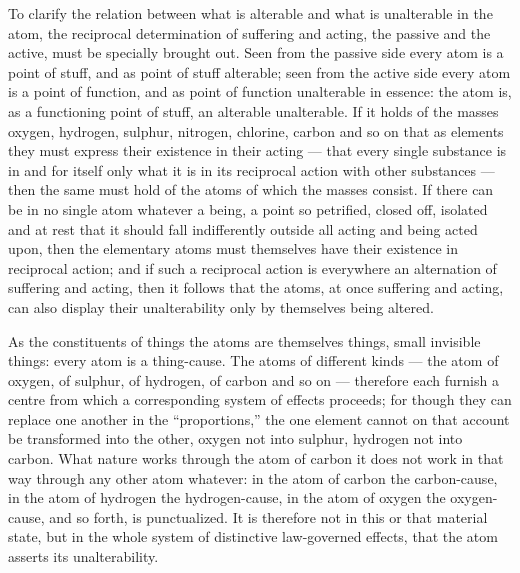 \documentclass[12pt,a4paper]{book}
\begin{document}
To clarify the relation between what is alterable and what is unalterable in
the atom, the reciprocal determination of suffering and acting, the passive and
the active, must be specially brought out. Seen
from the passive side every atom is a point of stuff, and as point of stuff
alterable; seen from the active side every atom is a point of function, and as
point of function unalterable in essence: the atom is, as a functioning point
of stuff, an alterable unalterable. If it holds of the masses oxygen, hydrogen,
sulphur, nitrogen, chlorine, carbon and so on that as elements they must
express their existence in their acting --- that every single substance is in
and for itself only what it is in its reciprocal action with other substances
--- then the same must hold of the atoms of which the masses consist. If there
can be in no single atom whatever a being, a point so petrified, closed off,
isolated and at rest that it should fall indifferently outside all acting and
being acted upon, then the elementary atoms must themselves have their
existence in reciprocal action; and if such a reciprocal action is everywhere
an alternation of suffering and acting, then it follows that the atoms, at once
suffering and acting, can also display their unalterability only by themselves
being altered.

As the constituents of things the atoms are themselves things, small invisible
things: every atom is a thing-cause. The atoms of different kinds --- the atom
of oxygen, of sulphur, of hydrogen, of carbon and so on --- therefore each
furnish a centre from which a corresponding system of effects proceeds; for
though they can replace one another in the ``proportions,'' the one element
cannot on that account be transformed into the other, oxygen not into sulphur,
hydrogen not into carbon. What nature works through the atom of carbon it does
not work in that way through any other atom whatever: in the atom of carbon the
carbon-cause, in the atom of hydrogen the hydrogen-cause, in the atom of oxygen
the oxygen-cause, and so forth, is punctualized. It is therefore not in this or
that material state, but in the whole system of distinctive law-governed
effects, that the atom asserts its unalterability.
\end{document}
